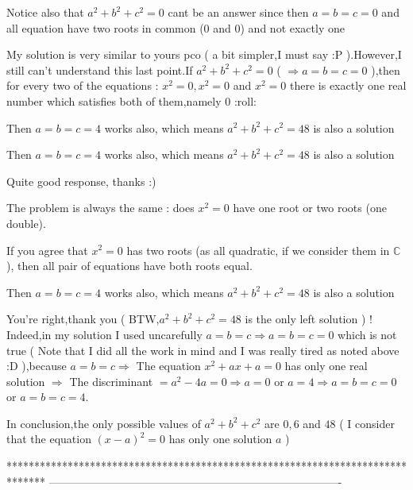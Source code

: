 \begin{solution}
	\begin{tcolorbox}Notice also that $ a^2 + b^2 + c^2 = 0$ cant be an answer since then $ a = b = c = 0$ and all equation have two roots in common ($ 0$ and $ 0$) and not exactly one\end{tcolorbox}
My solution is very similar to yours pco ( a bit simpler,I must say  :P  ).However,I still can't understand this last point.If $ a^2 + b^2 + c^2 = 0$ ( $ \Rightarrow a = b = c = 0$ ),then for every two of the equations : $ x^2 = 0,x^2 = 0$ and $ x^2 = 0$ there is exactly one real number which satisfies both of them,namely $ 0$  :roll:
\end{solution}



\begin{solution}
	Then $ a=b=c=4$ works also, which means $ a^2+b^2+c^2=48$ is also a solution
\end{solution}



\begin{solution}
	\begin{tcolorbox}Then $ a = b = c = 4$ works also, which means $ a^2 + b^2 + c^2 = 48$ is also a solution\end{tcolorbox}

Quite good response, thanks :)

The problem is always the same : does $ x^2 = 0$ have one root or two roots (one double).

If you agree that $ x^2 = 0$ has two roots (as all quadratic, if we consider them in $ \mathbb C$), then all pair of equations have both roots equal.
\end{solution}



\begin{solution}
	\begin{tcolorbox}Then $ a = b = c = 4$ works also, which means $ a^2 + b^2 + c^2 = 48$ is also a solution\end{tcolorbox}
You're right,thank you ( BTW,$ a^2 + b^2 + c^2 = 48$ is the only left solution ) ! Indeed,in my solution I used uncarefully $ a = b = c \Rightarrow a = b = c = 0$ which is not true ( Note that I did all the work in mind and I was really tired as noted above :D  ),because $ a = b = c \Rightarrow$ The equation $ x^2 + ax + a = 0$ has only one real  solution $ \Rightarrow$ The discriminant $ = a^2 - 4a = 0 \Rightarrow a = 0$ or $ a = 4 \Rightarrow a = b = c = 0$ or $ a = b = c = 4$.
 
In conclusion,the only possible values of $ a^2 + b^2 + c^2$ are $ 0,6$ and $ 48$ ( I consider that the equation $ (x - a)^2 = 0$ has only one solution $ a$ )
\end{solution}
*******************************************************************************
-------------------------------------------------------------------------------

